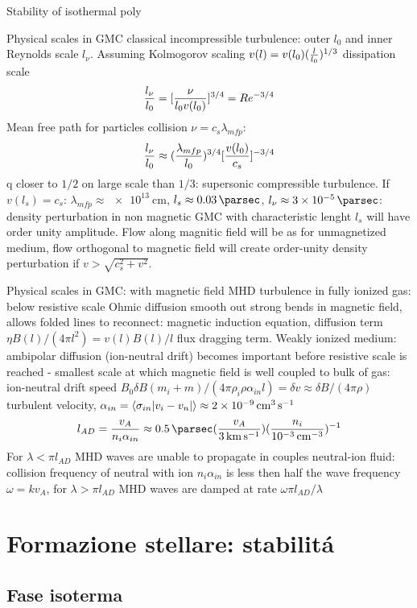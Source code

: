 \begin{frame}{Stability of isothermal poly}
\begin{frame}{Physical scales in GMC}
classical incompressible turbulence: outer $l_0$ and inner Reynolds scale $l_{\nu}$. Assuming Kolmogorov scaling $v(l)=v(l_0)(\frac{l}{l_0})^{1/3}$ dissipation scale
\[\frac{l_{\nu}}{l_0}=[\frac{\nu}{l_0v(l_0)}]^{3/4}=Re^{-3/4}\]
Mean free path for particles collision $\nu=c_s\lambda_{mfp}$:
\[\frac{l_{\nu}}{l_0}\approx(\frac{\lambda_{mfp}}{l_0})^{3/4}[\frac{v(l_0)}{c_s}]^{-3/4}\]
q closer to $1/2$ on large scale than $1/3$: supersonic compressible turbulence.
If $v(l_s)=c_s$: $\lambda_{mfp}\approx\SI{e13}{\cm}$, $l_s\approx\SI{0.03}{\parsec}$, $l_{\nu}\approx\SI{3e-5}{\parsec}$: density perturbation in non magnetic GMC with characteristic lenght $l_s$ will have order unity amplitude.
Flow along magnitic field will be as for unmagnetized medium, flow orthogonal to magnetic field will create order-unity density perturbation if  $v>\sqrt{c_s^2+v^2}$.
\end{frame}

\begin{frame}{Physical scales in GMC: with magnetic field}
MHD turbulence in fully ionized gas: below resistive scale Ohmic diffusion smooth out strong bends in magnetic field, allows folded lines to reconnect: magnetic induction equation, diffusion term $\eta B(l)/(4\pi l^2)=v(l)B(l)/l$ flux dragging term.
Weakly ionized medium: ambipolar diffusion (ion-neutral drift) becomes important before resistive scale is reached - smallest scale at which magnetic field is well coupled to bulk of gas: ion-neutral drift speed $B_0\delta B(m_i+m)/(4\pi\rho_i\rho\alpha_{in}l)=\delta v\approx\delta B/(4\pi\rho)$ turbulent velocity, $\alpha_{in}=\exv{\sigma_{in}|v_i-v_n|}\approx\SI{2e-9}{\cubic\cm\per\second}$
\[l_{AD}=\frac{v_A}{n_i\alpha_{in}}\approx\SI{0.5}{\parsec}(\frac{v_A}{\SI{3}{\kilo\meter\per\second}})(\frac{n_i}{\SI{e-3}{\per\cubic\cm}})\expy{-1}\]
For $\lambda<\pi l_{AD}$ MHD waves are unable to propagate in couples neutral-ion fluid: collision frequency of neutral with ion $n_i\alpha_{in}$ is less then half the wave frequency $\omega=kv_A$, for $\lambda>\pi l_{AD}$ MHD waves are damped at rate $\omega\pi l_{AD}/\lambda$
\end{frame}

\section{Formazione stellare: stabilit\'a}

\subsection{Fase isoterma}


\end{frame}

